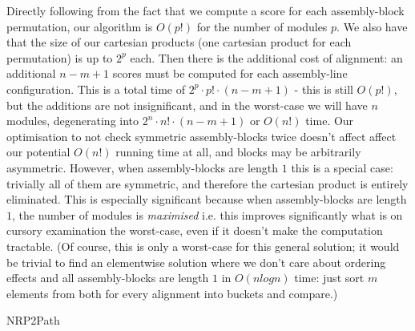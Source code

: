 \documentclass{l4proj}
\begin{document}
Directly following from the fact that we compute a score for each assembly-block permutation, our algorithm is \(O(p!)\) for the number of modules \(p\). We also have that the size of our cartesian products (one cartesian product for each permutation) is up to \(2^p\) each. Then there is the additional cost of alignment: an additional \(n-m+1\) scores must be computed for each assembly-line configuration. This is a total time of \(2^{p}\cdot{p!}\cdot(n-m+1)\) - this is still \(O(p!)\), but the additions are not insignificant, and in the worst-case we will have \(n\) modules, degenerating into \(2^{n}\cdot{n!}\cdot(n-m+1)\) or \(O(n!)\) time. Our optimisation to not check symmetric assembly-blocks twice doesn't affect affect our potential \(O(n!)\) running time at all, and blocks may be arbitrarily asymmetric. However, when assembly-blocks are length \(1\) this is a special case: trivially all of them are symmetric, and therefore the cartesian product is entirely eliminated. This is especially significant because when assembly-blocks are length \(1\), the number of modules is \textit{maximised} i.e. this improves significantly what is on cursory examination the worst-case, even if it doesn't make the computation tractable. (Of course, this is only a worst-case for this general solution; it would be trivial to find an elementwise solution where we don't care about ordering effects and all assembly-blocks are length \(1\) in \(O(nlogn)\) time: just sort \(m\) elements from both for every alignment into buckets and compare.)

\begin{algorithm}
    \DontPrintSemicolon

\caption{NRP2Path}\label{alg:nrp2path}
\end{algorithm}
\end{document}
